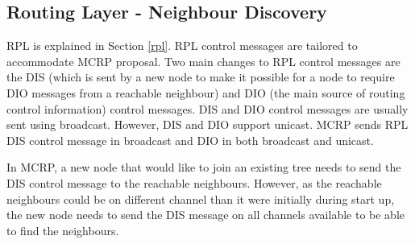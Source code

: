 



\subsection{Routing Layer - Neighbour Discovery}

RPL is explained in Section \ref{rpl}. RPL control messages are tailored to accommodate MCRP proposal. Two main changes to RPL control messages are the DIS (which is sent by a new node to make it possible for a node to require DIO messages from a reachable neighbour) and DIO (the main source of routing control information) control messages. DIS and DIO control messages are usually sent using broadcast. However, DIS and DIO support unicast. MCRP sends RPL DIS control message in broadcast and DIO in both broadcast and unicast. 

In MCRP, a new node that would like to join an existing tree needs to send the DIS control message to the reachable neighbours. However, as the reachable neighbours could be on different channel than it were initially during start up, the new node needs to send the DIS message on all channels available to be able to find the neighbours. 

